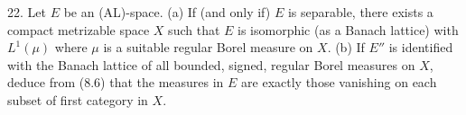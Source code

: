 22. Let $E$ be an (AL)-space.
(a) If (and only if) $E$ is separable, there exists a compact metrizable space $X$ such that $E$ is isomorphic (as a Banach lattice) with $L^1(\mu)$ where $\mu$ is a suitable regular Borel measure on $X$.
(b) If $E''$ is identified with the Banach lattice of all bounded, signed, regular Borel measures on $X$, deduce from (8.6) that the measures in $E$ are exactly those vanishing on each subset of first category in $X$.
